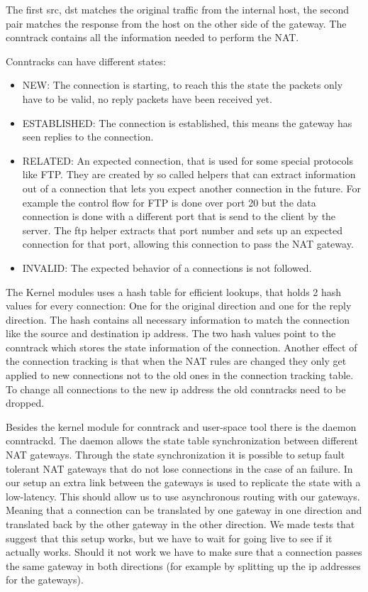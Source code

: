 The first src, dst matches the original traffic from the internal host,
the second pair matches the response from the host on the other side of
the gateway. The conntrack contains all the information needed to
perform the NAT.

Conntracks can have different states:

\begin{itemize}
\item
  NEW: The connection is starting, to reach this the state the packets
  only have to be valid, no reply packets have been received yet.
\item
  ESTABLISHED: The connection is established, this means the gateway has
  seen replies to the connection.
\item
  RELATED: An expected connection, that is used for some special
  protocols like FTP. They are created by so called helpers that can
  extract information out of a connection that lets you expect another
  connection in the future. For example the control flow for FTP is done
  over port 20 but the data connection is done with a different port
  that is send to the client by the server. The ftp helper extracts that
  port number and sets up an expected connection for that port, allowing
  this connection to pass the NAT gateway.
\item
  INVALID: The expected behavior of a connections is not followed.
\end{itemize}

The Kernel modules uses a hash table for efficient lookups, that holds 2
hash values for every connection: One for the original direction and one
for the reply direction. The hash contains all necessary information to
match the connection like the source and destination ip address. The two
hash values point to the conntrack which stores the state information of
the connection. Another effect of the connection tracking is that when
the NAT rules are changed they only get applied to new connections not
to the old ones in the connection tracking table. To change all
connections to the new ip address the old conntracks need to be dropped.

Besides the kernel module for conntrack and user-space tool there is the
daemon conntrackd. The daemon allows the state table synchronization
between different NAT gateways. Through the state synchronization it is
possible to setup fault tolerant NAT gateways that do not lose
connections in the case of an failure. In our setup an extra link
between the gateways is used to replicate the state with a low-latency.
This should allow us to use asynchronous routing with our gateways.
Meaning that a connection can be translated by one gateway in one
direction and translated back by the other gateway in the other
direction. We made tests that suggest that this setup works, but we have
to wait for going live to see if it actually works. Should it not work
we have to make sure that a connection passes the same gateway in both
directions (for example by splitting up the ip addresses for the
gateways).

